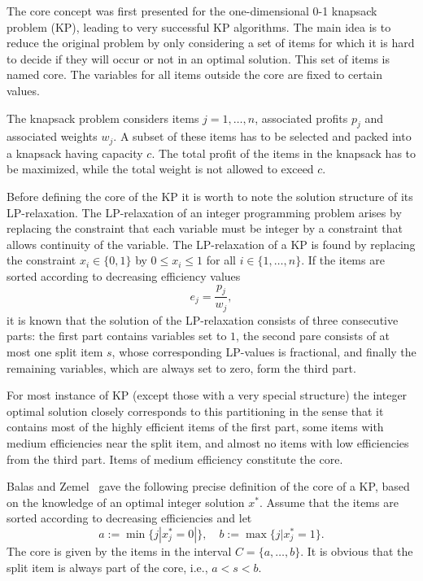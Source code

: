 The core concept was first presented for the one-dimensional 0-1 knapsack problem (KP),
leading to very successful KP algorithms.
The main idea is to reduce the original problem by only considering a set of
items for which it is hard to decide if they will occur or not in an optimal solution.
This set of items is named core.
The variables for all items outside the core are fixed to certain values.

The knapsack problem considers items $j = 1, \ldots, n$, associated profits $p_j$ and
associated weights $w_j$.
A subset of these items has to be selected and packed into a knapsack having capacity $c$.
The total profit of the items in the knapsack has to be maximized, while the
total weight is not allowed to exceed $c$.

Before defining the core of the KP it is worth to note the solution structure
of its LP-relaxation.
The LP-relaxation of an integer programming problem arises by replacing the
constraint that each variable must be integer by a constraint that allows
continuity of the variable.
The LP-relaxation of a KP is found by replacing the constraint $x_i \in \{0,1\}$
by $0 \leqslant x_i \leqslant 1$ for all $i \in \{1, \ldots, n\}$.
If the items are sorted according to decreasing efficiency values
\begin{displaymath}
  e_j = \frac{p_j}{w_j},
\end{displaymath}
it is known that the solution of the LP-relaxation consists of
three consecutive parts: the first part contains variables set to $1$, the second
pare consists of at most one split item $s$, whose corresponding LP-values is
fractional, and finally the remaining variables, which are always set to zero,
form the third part.

For most instance of KP (except those with a very special structure) the integer
optimal solution closely corresponds to this partitioning in the sense that it
contains most of the highly efficient items of the first part, some items with
medium efficiencies near the split item, and almost no items with low efficiencies
from the third part.
Items of medium efficiency constitute the core.

Balas and Zemel~\cite{balas1980algorithm} gave the following precise definition
of the core of a KP, based on the knowledge of an optimal integer solution $x^*$.
Assume that the items are sorted according to decreasing efficiencies and let
\begin{displaymath}
  a := \min\{ j | x_j^* = 0 |\}, \quad b := \max\{ j | x_j^* = 1 \}.
\end{displaymath}
The core is given by the items in the interval $C = \{a, \ldots, b\}$.
It is obvious that the split item is always part of the core, i.e., $a < s < b$.


